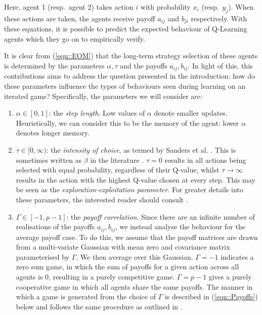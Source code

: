 \documentclass[sigconf,anonymous]{aamas}
\begin{document}
Here,
agent 1 (resp.~agent 2) takes action $i$ with probability
$x_i$ (resp.~$y_j$).
When these actions are taken, the agents
receive payoff $a_{ij}$ and $b_{ji}$ respectively. With these equations, it is possible to
predict the expected behaviour of Q-Learning agents which they go on to empirically verify.

It is clear from (\ref{eqn::EOM}) that the long-term strategy
selection of these agents is determined by the parameters $\alpha,
\tau$ and the payoffs $a_{ij}, b_{ij}$. In light of this, this
contributions aims to address the question presented in the
introduction: how do these parameters influence the types of behaviours
seen during learning on an iterated game? Specifically, the parameters
we will consider are:
%
\begin{enumerate}
    \item $\alpha \in [0, 1]$: the \textit{step length}. Low values of $\alpha$ denote smaller
    updates. Heuristically, we can consider this to be the memory of the agent: lower $\alpha$
    denotes longer memory.
    
    \item $\tau \in [0, \infty)$: the \textit{intensity of choice}, as
      termed by Sanders et al.  \cite{Sanders2018}. This is sometimes
      written as $\beta$ in the literature \cite{Sutton2018}.  $\tau =
      0$ results in all actions being selected with equal probability,
      regardless of their Q-value, whilst $\tau \rightarrow \infty$
      results in the action with the highest Q-value chosen at every
      step. This may be seen as the \textit{exploration-exploitation
        parameter}. For greater details into these parameters, the
      interested reader should consult \cite{Sutton2018}.
    
    \item $\Gamma \in [-1, p-1]$: the \textit{payoff
      correlation}. Since there are an infinite number of realisations
      of the payoffs $a_{ij}, b_{ij}$, we instead analyse the
      behaviour for the average payoff case. To do this, we assume
      that the payoff matrices are drawn from a multi-variate Gaussian
      with mean zero and covariance matrix parameterised by
      $\Gamma$. We then average over this Gaussian. $\Gamma = -1$
      indicates a zero sum game, in which the sum of payoffs for a
      given action across all agents is 0, resulting in a purely
      competitive game. $\Gamma = p-1$ gives a purely cooperative game
      in which all agents share the same payoffs. The manner in which
      a game is generated from the choice of $\Gamma$ is described in
      (\ref{eqn::Payoffs}) below and follows the same procedure as
      outlined in \cite{Sanders2018}.
\end{enumerate}
\end{document}
